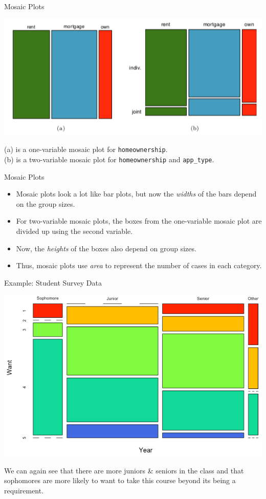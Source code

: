 \begin{frame}{Mosaic Plots}
    \begin{center}
        \includegraphics[scale=0.5]{images/mosaic.png}
    \end{center}
    \noindent(a) is a one-variable mosaic plot for \texttt{homeownership}.\\
    \noindent(b) is a two-variable mosaic plot for \texttt{homeownership} and \texttt{app\_type}.
\end{frame}

\begin{frame}{Mosaic Plots}
    \begin{itemize}
        \item Mosaic plots look a lot like bar plots, but now the \textit{widths} of the bars depend on the group sizes.
        \item For two-variable mosaic plots, the boxes from the one-variable mosaic plot are divided up using the second variable.
        \item Now, the \textit{heights} of the boxes also depend on group sizes.
        \item Thus, mosaic plots use \textit{area} to represent the number of cases in each category.
    \end{itemize}
\end{frame}

\begin{frame}{Example: Student Survey Data}
    \begin{center}
        \includegraphics[scale=0.35]{images/mosaicex.png}
    \end{center}
    We can again see that there are more juniors \& seniors in the class and that sophomores are more likely to want to take this course beyond its being a requirement. 
\end{frame}


